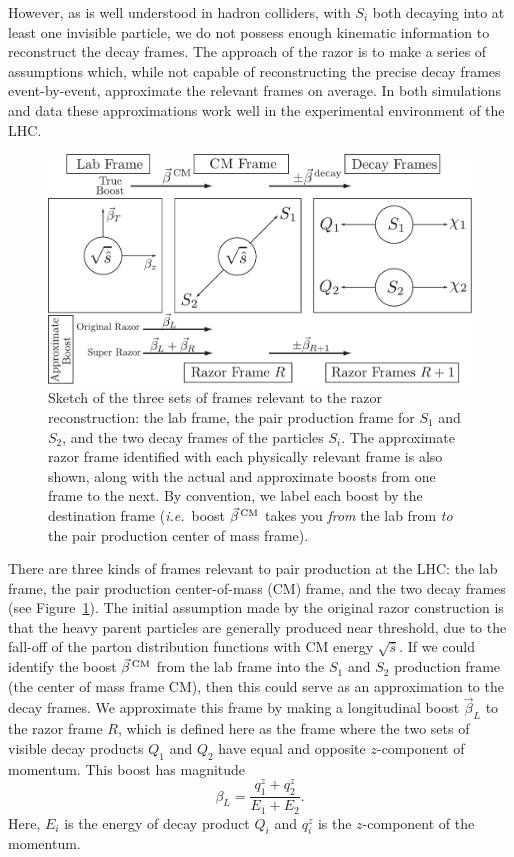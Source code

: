 However, as is well understood in hadron colliders, with $S_i$ both decaying into at least one invisible particle, we do not possess enough kinematic information to reconstruct the decay frames. The approach of the razor is to make a series of assumptions which, while not capable of reconstructing the precise decay frames event-by-event, approximate the relevant frames on average. In both simulations and data these approximations work well in the experimental environment of the LHC.

\begin{figure}[t]
\includegraphics[width=0.9\columnwidth]{./fig/sectionII/frames2.pdf}

\caption{Sketch of the three sets of frames relevant to the razor reconstruction: the lab frame, the pair production frame for $S_1$ and $S_2$, and the two decay frames of the particles $S_i$. The approximate razor frame identified with each physically relevant frame is also shown, along with the actual and approximate boosts from one frame to the next. By convention, we label each boost by the destination frame ({\it i.e.}~boost $\vec{\beta}^{\, \rm CM}$ takes you {\it from} the lab from {\it to} the pair production center of mass frame). \label{fig:frames}}
\end{figure}

There are three kinds of frames relevant to pair production at the LHC: the lab frame, the pair production center-of-mass (CM) frame, and the two decay frames (see Figure~\ref{fig:frames}). 
The initial assumption made by the original razor construction is that the heavy parent particles are generally produced near threshold, due to the fall-off of the parton distribution functions with CM energy $\sqrt{\hat{s}}$. If we could identify the boost $\vec{\beta}^{\, \rm CM}$ from the lab frame into the $S_1$ and $S_2$ production frame (the center of mass frame CM), then this could serve as an approximation to the decay frames. We approximate this frame by making a longitudinal boost $\vec{\beta}_L$ to the razor frame $R$, which is defined here as the frame where the two sets of visible decay products $Q_1$ and $Q_2$ have equal and opposite $z$-component of momentum. This boost has magnitude
\begin{equation}
\beta_L = \frac{q_1^z+q_2^z}{E_1+E_2}. \label{eq:betaL}
\end{equation}
Here, $E_i$ is the energy of decay product $Q_i$ and $q_i^z$ is the $z$-component of the momentum.

